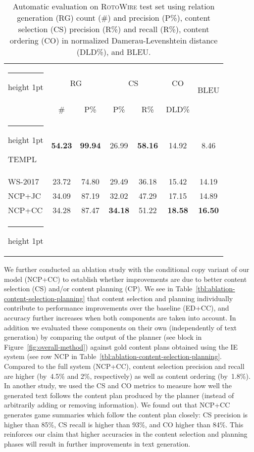 \documentclass[letterpaper]{article} \usepackage{aaai19}  \usepackage{times}  \usepackage{helvet}  \usepackage{courier}  \usepackage{url}  \usepackage{graphicx}  \frenchspacing  \setlength{\pdfpagewidth}{8.5in}  \setlength{\pdfpageheight}{11in}  \graphicspath{ {images/} }
\makeatletter
\newcommand{\thickhline}{\noalign {\ifnum 0=`}\fi \hrule height 1pt
    \futurelet \reserved@a \@xhline
}
\makeatother
\begin{document}
\begin{table}[t]
\small
\centering
\begin{tabular}{@{~}l@{~}|@{~}c@{~~~}c@{~}|c@{~~~}c|c|@{~}c@{~} } 
 \thickhline
 \multirow{2}{*}{Model} &\multicolumn{2}{c|}{RG} &\multicolumn{2}{c|}{CS} & CO & \multirow{2}{*}{BLEU}\\ 
 &\# & P\% & P\% & R\% & DLD\% & \\ \thickhline
TEMPL &\textbf{54.23} &\textbf{99.94} &26.99 &\textbf{58.16} &14.92 &\hspace*{1ex}8.46  \\
WS-2017 & 23.72 & 74.80 & 29.49 & 36.18 & 15.42 & 14.19 \\NCP+JC & 34.09 & 87.19 & 32.02 & 47.29 & 17.15 & 14.89 \\ NCP+CC &{34.28} & {87.47} & \textbf{34.18} & {51.22}
 &\textbf{18.58} & \textbf{16.50}\\ \thickhline
\end{tabular}
\caption{\label{generation-from-plan-test} Automatic evaluation
  on  \textsc{RotoWire} test set using   relation generation (RG)
  count (\#) and precision (P\%), content selection (CS) precision
  (R\%) and recall (R\%), content ordering (CO) in normalized
  Damerau-Levenshtein distance (DLD\%), and BLEU.} 
\end{table}

We further conducted an ablation study with the conditional copy
variant of our model (NCP+CC) to establish whether improvements
are due to better content selection (CS) and/or content planning (CP).
We see in Table~\ref{tbl:ablation-content-selection-planning} that
content selection and planning individually contribute to performance
improvements over the baseline (ED+CC), and accuracy further increases
when both components are taken into account.  In addition we evaluated
these components on their own (independently of text generation) by
comparing the output of the planner (see  block in
Figure~\ref{fig:overall-method}) against gold content plans obtained
using the IE system (see row NCP in
Table~\ref{tbl:ablation-content-selection-planning}.  Compared to the
full system (NCP+CC), content selection precision and recall are
higher (by~4.5\% and 2\%, respectively) as well as content ordering
(by~1.8\%). In another study, we used the CS and CO metrics to measure
how well the generated text follows the content plan produced by the
planner (instead of arbitrarily adding or removing information). We
found out that NCP+CC generates game summaries which follow the
content plan closely: CS precision is higher than 85\%, CS recall is
higher than 93\%, and CO higher than 84\%. This reinforces our claim
that higher accuracies in the content selection and planning phases
will result in further improvements in text generation.
\end{document}
